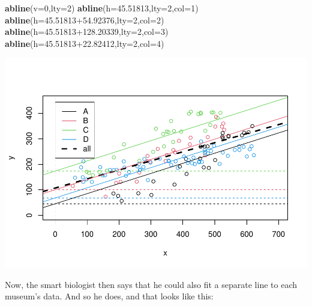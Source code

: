\documentclass[
]{book}
\newenvironment{Shaded}{\begin{snugshade}}{\end{snugshade}}
\newcommand{\DataTypeTok}[1]{\textcolor[rgb]{0.13,0.29,0.53}{#1}}
\newcommand{\DecValTok}[1]{\textcolor[rgb]{0.00,0.00,0.81}{#1}}
\newcommand{\FloatTok}[1]{\textcolor[rgb]{0.00,0.00,0.81}{#1}}
\newcommand{\KeywordTok}[1]{\textcolor[rgb]{0.13,0.29,0.53}{\textbf{#1}}}
\newcommand{\NormalTok}[1]{#1}
\begin{document}
\begin{Shaded}
\begin{Highlighting}[]
\KeywordTok{abline}\NormalTok{(}\DataTypeTok{v=}\DecValTok{0}\NormalTok{,}\DataTypeTok{lty=}\DecValTok{2}\NormalTok{)}
\KeywordTok{abline}\NormalTok{(}\DataTypeTok{h=}\FloatTok{45.51813}\NormalTok{,}\DataTypeTok{lty=}\DecValTok{2}\NormalTok{,}\DataTypeTok{col=}\DecValTok{1}\NormalTok{)}
\KeywordTok{abline}\NormalTok{(}\DataTypeTok{h=}\FloatTok{45.51813+54.92376}\NormalTok{,}\DataTypeTok{lty=}\DecValTok{2}\NormalTok{,}\DataTypeTok{col=}\DecValTok{2}\NormalTok{)}
\KeywordTok{abline}\NormalTok{(}\DataTypeTok{h=}\FloatTok{45.51813+128.20339}\NormalTok{,}\DataTypeTok{lty=}\DecValTok{2}\NormalTok{,}\DataTypeTok{col=}\DecValTok{3}\NormalTok{)}
\KeywordTok{abline}\NormalTok{(}\DataTypeTok{h=}\FloatTok{45.51813+22.82412}\NormalTok{,}\DataTypeTok{lty=}\DecValTok{2}\NormalTok{,}\DataTypeTok{col=}\DecValTok{4}\NormalTok{)}
\end{Highlighting}
\end{Shaded}

\includegraphics{ECOMODbook_files/figure-latex/a7.14-1.pdf}

Now, the smart biologist then says that he could also fit a separate line to each museum's data. And so he does, and that looks like this:
\end{document}
